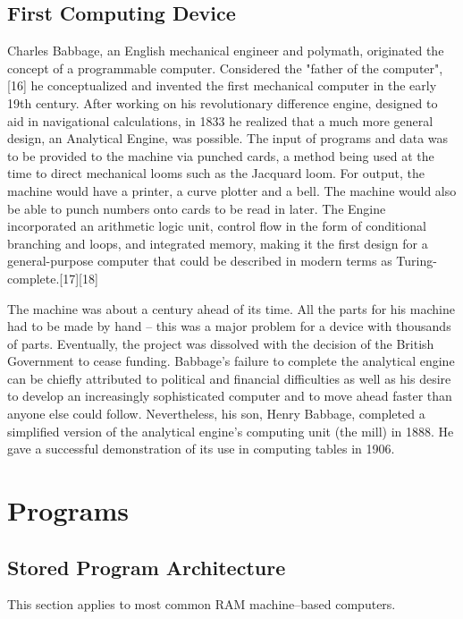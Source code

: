 \documentclass[a4paper,11pt]{IEEEtran}
\begin{document}
\subsection{First Computing Device}
Charles Babbage, an English mechanical engineer and polymath, originated the concept of a programmable computer. Considered the "father of the computer",[16] he conceptualized and invented the first mechanical computer in the early 19th century. After working on his revolutionary difference engine, designed to aid in navigational calculations, in 1833 he realized that a much more general design, an Analytical Engine, was possible. The input of programs and data was to be provided to the machine via punched cards, a method being used at the time to direct mechanical looms such as the Jacquard loom. For output, the machine would have a printer, a curve plotter and a bell. The machine would also be able to punch numbers onto cards to be read in later. The Engine incorporated an arithmetic logic unit, control flow in the form of conditional branching and loops, and integrated memory, making it the first design for a general-purpose computer that could be described in modern terms as Turing-complete.[17][18]

The machine was about a century ahead of its time. All the parts for his machine had to be made by hand – this was a major problem for a device with thousands of parts. Eventually, the project was dissolved with the decision of the British Government to cease funding. Babbage's failure to complete the analytical engine can be chiefly attributed to political and financial difficulties as well as his desire to develop an increasingly sophisticated computer and to move ahead faster than anyone else could follow. Nevertheless, his son, Henry Babbage, completed a simplified version of the analytical engine's computing unit (the mill) in 1888. He gave a successful demonstration of its use in computing tables in 1906. 
\section{Programs}
\subsection{Stored Program Architecture}
This section applies to most common RAM machine–based computers.
\end{document}
